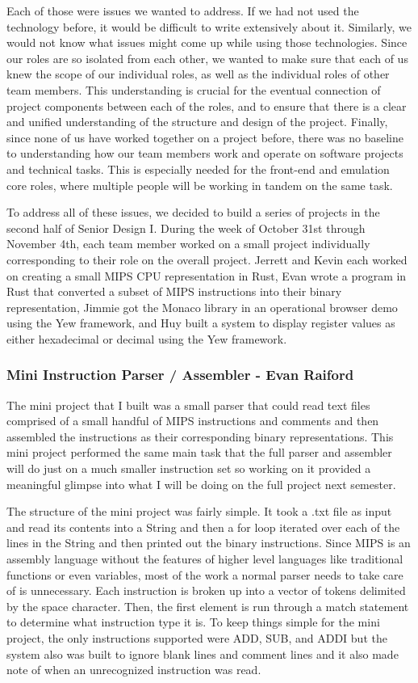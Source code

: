 \documentclass[
    paper=letter,
    parskip=half,
    fontsize=12pt,
    titlepage=firstiscover,
    toc=bibliography,
    numbers=endperiod
]{scrartcl}
\begin{document}
Each of those were issues we wanted to address. If we had not used the
technology before, it would be difficult to write extensively about it.
Similarly, we would not know what issues might come up while using those
technologies. Since our roles are so isolated from each other, we wanted
to make sure that each of us knew the scope of our individual roles, as
well as the individual roles of other team members. This understanding
is crucial for the eventual connection of project components between
each of the roles, and to ensure that there is a clear and unified
understanding of the structure and design of the project. Finally, since
none of us have worked together on a project before, there was no
baseline to understanding how our team members work and operate on
software projects and technical tasks. This is especially needed for the
front-end and emulation core roles, where multiple people will be
working in tandem on the same task.

To address all of these issues, we decided to build a series of projects
in the second half of Senior Design I. During the week of October 31st
through November 4th, each team member worked on a small project
individually corresponding to their role on the overall project. Jerrett
and Kevin each worked on creating a small MIPS CPU representation in
Rust, Evan wrote a program in Rust that converted a subset of MIPS
instructions into their binary representation, Jimmie got the Monaco
library in an operational browser demo using the Yew framework, and Huy
built a system to display register values as either hexadecimal or
decimal using the Yew framework.

\subsubsection{Mini Instruction Parser / Assembler - Evan Raiford}

The mini project that I built was a small parser that could read text
files comprised of a small handful of MIPS instructions and comments and
then assembled the instructions as their corresponding binary
representations. This mini project performed the same main task that the
full parser and assembler will do just on a much smaller instruction set
so working on it provided a meaningful glimpse into what I will be doing
on the full project next semester.

The structure of the mini project was fairly simple. It took a .txt file
as input and read its contents into a String and then a for loop
iterated over each of the lines in the String and then printed out the
binary instructions. Since MIPS is an assembly language without the
features of higher level languages like traditional functions or even
variables, most of the work a normal parser needs to take care of is
unnecessary. Each instruction is broken up into a vector of tokens
delimited by the space character. Then, the first element is run through
a match statement to determine what instruction type it is. To keep
things simple for the mini project, the only instructions supported were
ADD, SUB, and ADDI but the system also was built to ignore blank lines
and comment lines and it also made note of when an unrecognized
instruction was read.
\end{document}
